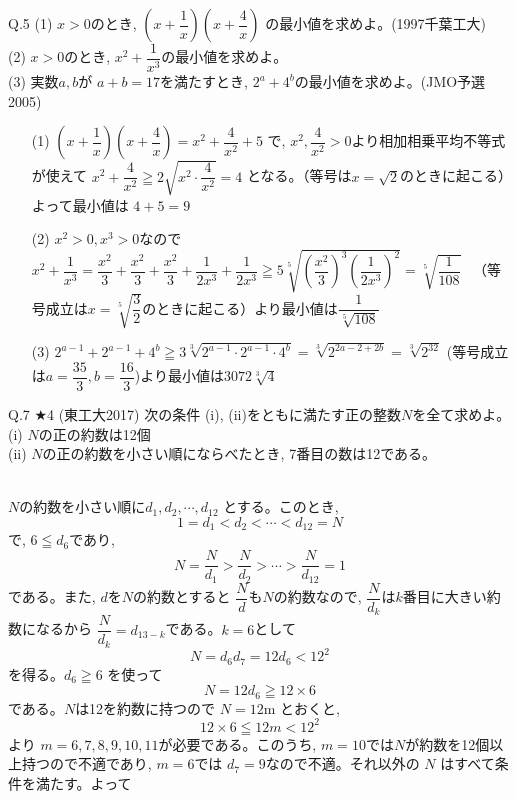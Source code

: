 \documentclass[twocolumn]{jsarticle}
\newcommand{\thm}{\begin{itembox}[l]}
\newcommand{\enthm}{\end{itembox}\\}
\renewcommand{\leq}{\leqq}
\renewcommand{\geq}{\geqq}
\newcommand{\hosi}{$\bigstar$}
\begin{document}
\thm{Q.5 }
(1) $x>0$のとき, $\left(x+\dfrac{1}{x}\right)\left(x+\dfrac{4}{x}\right)$ の最小値を求めよ。(1997千葉工大)\\
(2) $x>0$のとき, $x^2+\dfrac{1}{x^3}$の最小値を求めよ。\\
(3) 実数$a,b$が $a+b=17$を満たすとき, $2^a+4^b$の最小値を求めよ。(JMO予選2005)
\end{itembox}
\begin{enumerate}
\item[(1)] $\left(x+\dfrac{1}{x}\right)\left(x+\dfrac{4}{x}\right)=x^2+\dfrac{4}{x^2}+5$ で, $x^2,\dfrac{4}{x^2}>0$より相加相乗平均不等式が使えて $x^2+\dfrac{4}{x^2}\geq 2\sqrt{x^2\cdot \dfrac{4}{x^2}}=4$ となる。（等号は$x=\sqrt{2}$のときに起こる）よって最小値は $4+5=9$
\item[(2)] $x^2>0, x^3>0$なので$x^2+\dfrac{1}{x^3}=\dfrac{x^2}{3}+\dfrac{x^2}{3}+\dfrac{x^2}{3}+\dfrac{1}{2x^3}+\dfrac{1}{2x^3}\geq 5\sqrt[5]{\left(\dfrac{x^2}{3}\right)^3\left(\dfrac{1}{2x^3}\right)^2}=\sqrt[5]{\dfrac{1}{108}}$ 　（等号成立は$x=\sqrt[5]{\dfrac{3}{2}}$のときに起こる）より最小値は$\dfrac{1}{\sqrt[5]{108}}$
\item[(3)] $2^{a-1}+2^{a-1}+4^b\geq 3\sqrt[3]{2^{a-1}\cdot 2^{a-1}\cdot 4^b}=\sqrt[3]{2^{2a-2+2b}}=\sqrt[3]{2^{32}}$ (等号成立は$a=\dfrac{35}{3}, b=\dfrac{16}{3}$)より最小値は$3072\sqrt[3]{4}$
\end{enumerate}

\thm{Q.7 \hosi 4 (東工大2017)}
次の条件 (i), (ii)をともに満たす正の整数$N$を全て求めよ。\\
(i) $N$の正の約数は12個\\
(ii) $N$の正の約数を小さい順にならべたとき, 7番目の数は12である。
\enthm
$N$の約数を小さい順に$d_1, d_2,\cdots , d_{12}$ とする。このとき,
\[1=d_1<d_2<\cdots <d_{12}=N\]
で, $6\leq d_6$であり,
\[N=\dfrac{N}{d_1}>\dfrac{N}{d_2}>\cdots > \dfrac{N}{d_{12}}=1\]
である。また, $d$を$N$の約数とすると $\dfrac{N}{d}$も$N$の約数なので, $\dfrac{N}{d_k}$は$k$番目に大きい約数になるから $\dfrac{N}{d_k}=d_{13-k}$である。$k=6$として 
\[ N=d_6d_7=12d_6<12^2\]
を得る。$d_6\geq 6$ を使って
\[N=12d_6\geq 12\times 6\]
である。$N$は12を約数に持つので $N=12$m とおくと, 
\[12\times 6\leq 12m<12^2\]
より $m=6,7,8,9,10,11$が必要である。このうち, $m=10$では$N$が約数を12個以上持つので不適であり, $m=6$では $d_7=9$なので不適。それ以外の $N$ はすべて条件を満たす。よって {}
\end{document}
